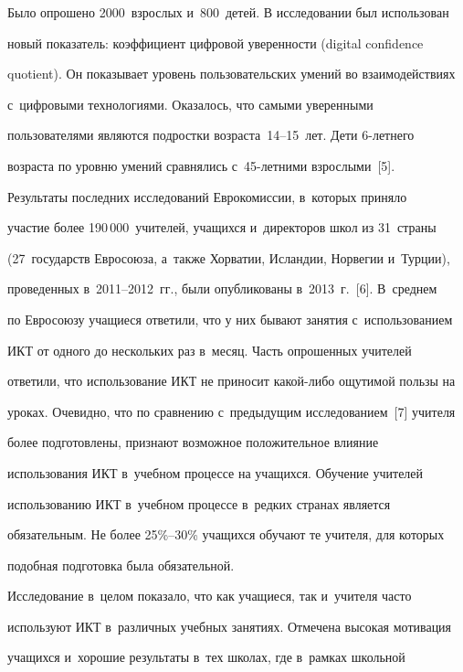 Было опрошено 2000~взрослых и~800~детей. В исследовании был использован 


новый показатель: коэффициент цифровой уверенности (digital confidence 


quotient). Он показывает уровень пользовательских умений во взаимодействиях 


с~цифровыми технологиями. Оказалось, что самыми уверенными 


пользователями являются подростки возраста~14--15~лет. Дети 6-лет\-не\-го 


возраста по уровню умений сравнялись с~45-лет\-ни\-ми взрослыми~[5].


  


  Результаты последних исследований Еврокомиссии, в~которых приняло 


учас\-тие более 190\,000~учителей, учащихся и~директоров школ из 31~страны 


(27~государств Евросоюза, а~также Хорватии, Исландии, Норвегии и~Турции), 


проведенных в~2011--2012~гг., были опубликованы в~2013~г.~[6]. В~среднем 


по Евросоюзу учащиеся ответили, что у них бывают занятия с~использованием 


ИКТ от одного до нескольких раз в~месяц. Часть опрошенных учителей 


ответили, что использование ИКТ не приносит какой-либо ощутимой пользы на 


уроках. Очевидно, что по сравнению с~предыдущим исследованием~[7] учителя 


более подготовлены, признают возможное положительное влияние 


использования ИКТ в~учебном процессе на учащихся. Обучение учителей 


использованию ИКТ в~учебном процессе в~редких странах является 


обязательным. Не более 25\%--30\% учащихся обучают те учителя, для которых 


подобная подготовка была обязательной. 


  


  Исследование в~целом показало, что как учащиеся, так и~учителя часто 


используют ИКТ в~различных учебных занятиях. Отмечена высокая мотивация 


учащихся и~хорошие результаты в~тех школах, где в~рамках школьной 



